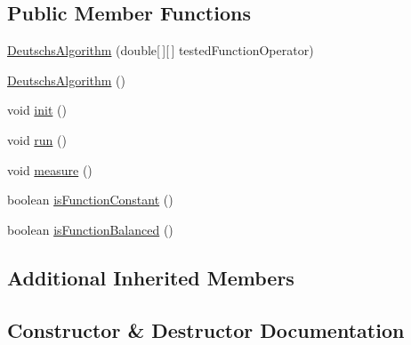 \subsection*{Public Member Functions}
\begin{DoxyCompactItemize}
\item 
\hyperlink{classcom_1_1ars_1_1algorithms_1_1deutsch_1_1_deutschs_algorithm_a25599a3eb05e6bbf425692a3352462f6}{Deutschs\+Algorithm} (double\mbox{[}$\,$\mbox{]}\mbox{[}$\,$\mbox{]} tested\+Function\+Operator)
\item 
\hyperlink{classcom_1_1ars_1_1algorithms_1_1deutsch_1_1_deutschs_algorithm_a2908de89b7f76d8160272af477a1dc42}{Deutschs\+Algorithm} ()
\item 
void \hyperlink{classcom_1_1ars_1_1algorithms_1_1deutsch_1_1_deutschs_algorithm_a01537777ec24738faf83660313759ea4}{init} ()
\item 
void \hyperlink{classcom_1_1ars_1_1algorithms_1_1deutsch_1_1_deutschs_algorithm_afb9f22b5a65a36c5a2828e7f06e4563e}{run} ()
\item 
void \hyperlink{classcom_1_1ars_1_1algorithms_1_1deutsch_1_1_deutschs_algorithm_a205c99180da5c481f6733d07759de636}{measure} ()
\item 
boolean \hyperlink{classcom_1_1ars_1_1algorithms_1_1deutsch_1_1_deutschs_algorithm_a853d89cbac22f31c9b0fd24e53c3930d}{is\+Function\+Constant} ()
\item 
boolean \hyperlink{classcom_1_1ars_1_1algorithms_1_1deutsch_1_1_deutschs_algorithm_ad0d426fd3aa5441adb8892d9ccbe9705}{is\+Function\+Balanced} ()
\end{DoxyCompactItemize}
\subsection*{Additional Inherited Members}


\subsection{Constructor \& Destructor Documentation}
\hypertarget{classcom_1_1ars_1_1algorithms_1_1deutsch_1_1_deutschs_algorithm_a25599a3eb05e6bbf425692a3352462f6}{}\label{classcom_1_1ars_1_1algorithms_1_1deutsch_1_1_deutschs_algorithm_a25599a3eb05e6bbf425692a3352462f6} 
